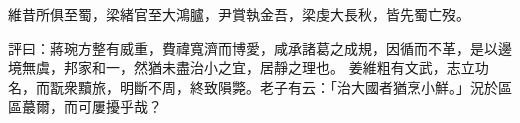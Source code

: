 \begin{pinyinscope}
 
 
 
 維昔所俱至蜀，梁緒官至大鴻臚，尹賞執金吾，梁虔大長秋，皆先蜀亡歿。
 
 
評曰：蔣琬方整有威重，費禕寬濟而博愛，咸承諸葛之成規，因循而不革，是以邊境無虞，邦家和一，然猶未盡治小之宜，居靜之理也。
 姜維粗有文武，志立功名，而翫衆黷旅，明斷不周，終致隕斃。老子有云：「治大國者猶烹小鮮。」況於區區蕞爾，而可屢擾乎哉？
 
 
\end{pinyinscope}